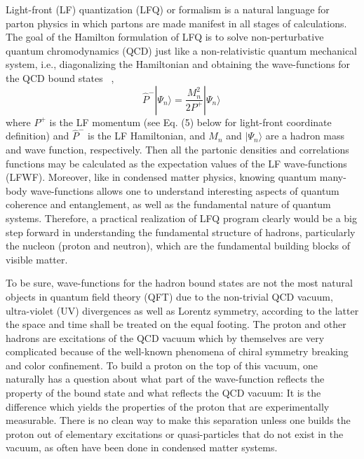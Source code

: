 \documentclass[twocolumn,superscriptaddress,longbibliography,10pt]{revtex4-1}
\begin{document}
Light-front (LF) quantization (LFQ) or formalism is a natural language for parton physics
in which partons are made manifest in all stages of calculations. The goal of the
Hamilton formulation of LFQ is to solve non-perturbative quantum chromodynamics (QCD) just like a non-relativistic quantum
mechanical system, i.e., diagonalizing the Hamiltonian and obtaining the wave-functions for
the QCD bound states
~\cite{Brodsky:1997de},
\begin{equation}\label{eq:LFeigen}
      \hat P^-|\Psi_n\rangle = \frac{M^2_n}{2P^+}|\Psi_n\rangle \,
\end{equation}
where $P^+$ is the LF momentum (see Eq. (5) below for light-front coordinate definition) and $\hat P^-$ is the LF Hamiltonian, and $M_n$ and $|\Psi_n\rangle$
are a hadron mass and wave function, respectively.
Then all the partonic densities and correlations functions may be calculated as the expectation values of the LF wave-functions (LFWF). Moreover, like in condensed matter physics, knowing quantum many-body wave-functions allows one to understand interesting aspects of quantum coherence and entanglement, as well as the fundamental nature of quantum systems. Therefore, a practical realization of LFQ program clearly would be a big step forward in understanding the fundamental structure of hadrons, particularly the nucleon (proton and neutron), which are the fundamental building blocks of visible matter.

To be sure, wave-functions for the hadron bound states are not the most natural objects in quantum field theory (QFT) due to the non-trivial QCD vacuum, ultra-violet (UV) divergences as well as Lorentz symmetry, according to the latter the space and
time shall be treated on the equal footing. The proton and other hadrons are excitations of the QCD vacuum which by themselves are very complicated because of the well-known phenomena of chiral symmetry breaking and color confinement.
To build a proton on the top of this vacuum, one naturally has a question about what part of the
wave-function reflects the property of the bound state and what reflects the QCD vacuum:
It is the difference which yields the properties
of the proton that are experimentally measurable. There is no clean way to make this separation unless one builds the proton out of elementary excitations or quasi-particles that
do not exist in the vacuum, as often have been done in condensed matter systems.
\end{document}
